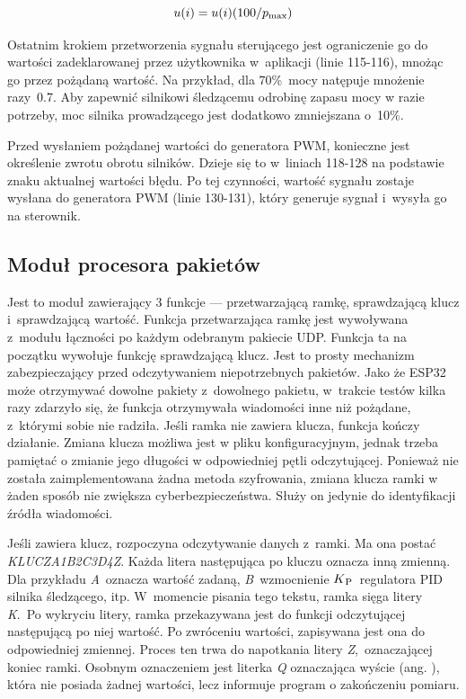 \begin{equation}\label{eq:signaltopercent}
  u(i)=u(i)(100 / p\textsubscript{max})
\end{equation}

Ostatnim krokiem przetworzenia sygnału sterującego jest ograniczenie go do wartości zadeklarowanej przez użytkownika w~aplikacji (linie 115-116), mnożąc go przez pożądaną wartość. Na przykład, dla 70\%~mocy natępuje mnożenie razy~0.7. Aby zapewnić silnikowi śledzącemu odrobinę zapasu mocy w razie potrzeby, moc silnika prowadzącego jest dodatkowo zmniejszana o~10\%.

Przed wysłaniem pożądanej wartości do generatora PWM, konieczne jest określenie zwrotu obrotu silników. Dzieje się to w~liniach 118-128 na podstawie znaku aktualnej wartości błędu. Po tej czynności, wartość sygnału zostaje wysłana do generatora PWM (linie 130-131), który generuje sygnał i~wysyła go na sterownik.

\subsection*{Moduł procesora pakietów}
Jest to moduł zawierający 3 funkcje --- przetwarzającą ramkę, sprawdzającą klucz i~sprawdzającą wartość. Funkcja przetwarzająca ramkę jest wywoływana z~modułu łączności po każdym odebranym pakiecie UDP. Funkcja ta na początku wywołuje funkcję sprawdzającą klucz. Jest to prosty mechanizm zabezpieczający przed odczytywaniem niepotrzebnych pakietów. Jako że ESP32 może otrzymywać dowolne pakiety z~dowolnego pakietu, w~trakcie testów kilka razy zdarzyło się, że funkcja otrzymywała wiadomości inne niż pożądane, z~którymi sobie nie radziła. Jeśli ramka nie zawiera klucza, funkcja kończy działanie. Zmiana klucza możliwa jest w pliku konfiguracyjnym, jednak trzeba pamiętać o zmianie jego długości w odpowiedniej pętli odczytującej. Ponieważ nie została zaimplementowana żadna metoda szyfrowania, zmiana klucza ramki w żaden sposób nie zwiększa cyberbezpieczeństwa. Służy on jedynie do identyfikacji źródła wiadomości.

Jeśli zawiera klucz, rozpoczyna odczytywanie danych z~ramki. Ma ona postać \textit{KLUCZA1B2C3D4Z}. Każda litera następująca po kluczu oznacza inną zmienną. Dla przykładu \textit{A}~oznacza wartość zadaną, \textit{B}~wzmocnienie $K\textsubscript{P}$~regulatora PID silnika śledzącego, itp. W~momencie pisania tego tekstu, ramka sięga litery \textit{K}.~Po wykryciu litery, ramka przekazywana jest do funkcji odczytującej następującą po niej wartość. Po zwróceniu wartości, zapisywana jest ona do odpowiedniej zmiennej. Proces ten trwa do napotkania litery \textit{Z},~oznaczającej koniec ramki. Osobnym oznaczeniem jest literka \textit{Q} oznaczająca wyście (ang. ), która nie posiada żadnej wartości, lecz informuje program o zakończeniu pomiaru. 

